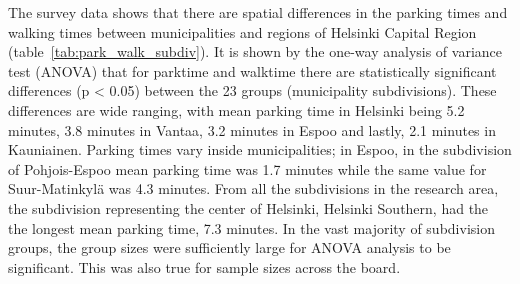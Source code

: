 The survey data shows that there are spatial differences in the parking times and walking times between municipalities and regions of Helsinki Capital Region (table~\ref{tab:park_walk_subdiv}). It is shown by the one-way analysis of variance test (ANOVA) that for parktime and walktime there are statistically significant differences (p < 0.05) between the 23 groups (municipality subdivisions). These differences are wide ranging, with mean parking time in Helsinki being 5.2 minutes, 3.8 minutes in Vantaa, 3.2 minutes in Espoo and lastly, 2.1 minutes in Kauniainen. Parking times vary inside municipalities; in Espoo, in the subdivision of Pohjois-Espoo mean parking time was 1.7 minutes while the same value for Suur-Matinkylä was 4.3 minutes. From all the subdivisions in the research area, the subdivision representing the center of Helsinki, Helsinki Southern, had the the longest mean parking time, 7.3 minutes. In the vast majority of subdivision groups, the group sizes were sufficiently large for ANOVA analysis to be significant. This was also true for sample sizes across the board.


